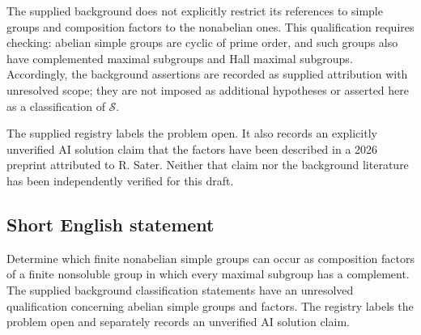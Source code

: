 \documentclass[11pt]{article}
\begin{document}
The supplied background does not explicitly restrict its references to simple groups and composition factors to the nonabelian ones. This qualification requires checking: abelian simple groups are cyclic of prime order, and such groups also have complemented maximal subgroups and Hall maximal subgroups. Accordingly, the background assertions are recorded as supplied attribution with unresolved scope; they are not imposed as additional hypotheses or asserted here as a classification of \(\mathcal S\).

The supplied registry labels the problem open. It also records an explicitly unverified AI solution claim that the factors have been described in a 2026 preprint attributed to R. Sater. Neither that claim nor the background literature has been independently verified for this draft.
\subsection{Short English statement}
Determine which finite nonabelian simple groups can occur as composition factors of a finite nonsoluble group in which every maximal subgroup has a complement. The supplied background classification statements have an unresolved qualification concerning abelian simple groups and factors. The registry labels the problem open and separately records an unverified AI solution claim.
\end{document}
